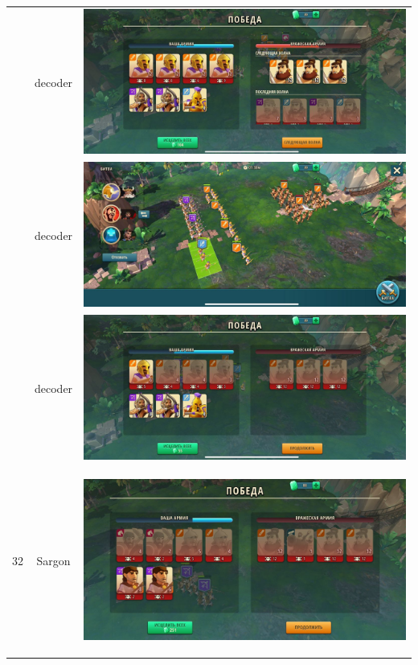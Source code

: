 \begin{longtable}{|c|c|c|}
	& decoder &
	\includegraphics[width=0.75\linewidth]{./parts/media/TreasureHunt/31/decoder/photo_2022-04-07_09-59-58.jpg} \\
	& decoder &
	\includegraphics[width=0.75\linewidth]{./parts/media/TreasureHunt/31/decoder/photo_2022-04-07_10-00-36.jpg} \\
	& decoder &
	\includegraphics[width=0.75\linewidth]{./parts/media/TreasureHunt/31/decoder/photo_2022-04-07_10-00-46.jpg} \\
	\hline
	\multirow{16}{*}{32} & Sargon &
	\hypertarget{fight32}{\includegraphics[width=0.75\linewidth]{./parts/media/TreasureHunt/32/sargon/photo_2022-04-07_10-05-45.jpg}} \\

\end{longtable}
